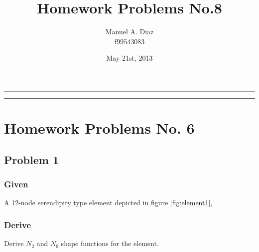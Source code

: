 \documentclass[a4paper]{memoir}
\title{\huge \textbf{Homework Problems No.8}}
\author{Manuel A. Diaz \\ f99543083}
\date{May 21st, 2013} %
\begin{document}
\thispagestyle{empty}
\begin{center}{
\begin{shaded}
\hrule \vspace{30pt}
\hspace{30pt} \thetitle  \vspace{30pt}
\newline \theauthor \hspace{30pt} \thedate  \vspace{26pt}
\hrule
\end{shaded}
}
\end{center}
\clearpage


\pagestyle{Ruled}                    %
\midsloppy                             %


\checkandfixthelayout          %


\chapter{Homework Problems No. 6}
\section{Problem 1}
\subsection{Given}
A 12-node serendipity type element depicted in figure \ref{fig:element1},

\subsection{Derive}
Derive $N_2$ and $N_9$ shape functions for the element.
\end{document}
